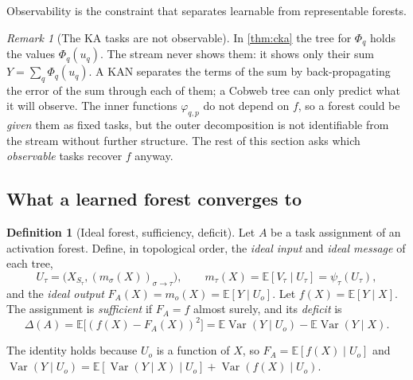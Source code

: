 \documentclass[11pt]{article}
\theoremstyle{definition}
\newtheorem{definition}[theorem]{Definition}
\theoremstyle{remark}
\newtheorem{remark}[theorem]{Remark}
\newcommand{\E}{\mathbb{E}}
\newcommand{\Var}{\operatorname{Var}}
\begin{document}
Observability is the constraint that separates learnable from representable forests.

\begin{remark}[The KA tasks are not observable]\label{rem:kaobs}
In \cref{thm:cka} the tree for $\Phi_q$ holds the values $\Phi_q(u_q)$.  The stream
never shows them: it shows only their sum $Y=\sum_q\Phi_q(u_q)$.  A KAN separates the
terms of the sum by back-propagating the error of the sum through each of them; a Cobweb
tree can only predict what it will observe.  The inner functions $\varphi_{q,p}$ do not
depend on $f$, so a forest could be \emph{given} them as fixed tasks, but the outer
decomposition is not identifiable from the stream without further structure.  The rest
of this section asks which \emph{observable} tasks recover $f$ anyway.
\end{remark}

\subsection{What a learned forest converges to}

\begin{definition}[Ideal forest, sufficiency, deficit]\label{def:ideal}
Let $A$ be a task assignment of an activation forest.  Define, in topological order,
the \emph{ideal input} and \emph{ideal message} of each tree,
\[
  U_\tau=\bigl(X_{S_\tau},(m_\sigma(X))_{\sigma\to\tau}\bigr),\qquad
  m_\tau(X)=\E[V_\tau\mid U_\tau]=\psi_\tau(U_\tau),
\]
and the \emph{ideal output} $F_A(X)=m_o(X)=\E[Y\mid U_o]$.  Let $f(X)=\E[Y\mid X]$.  The
assignment is \emph{sufficient} if $F_A=f$ almost surely, and its \emph{deficit} is
\[
  \Delta(A)=\E\bigl[(f(X)-F_A(X))^2\bigr]=\E\Var(Y\mid U_o)-\E\Var(Y\mid X).
\]
\end{definition}

The identity holds because $U_o$ is a function of $X$, so $F_A=\E[f(X)\mid U_o]$ and
$\Var(Y\mid U_o)=\E[\Var(Y\mid X)\mid U_o]+\Var(f(X)\mid U_o)$.
\end{document}
